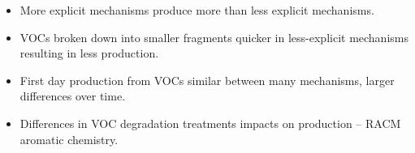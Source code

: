 \begin{BlueBox}
    \vskip-1cm
    \begin{block}{}
        \begin{itemize}
            \item More explicit mechanisms produce more  than less explicit mechanisms. \vspace{10mm}
            \item VOCs broken down into smaller fragments quicker in less-explicit mechanisms resulting in less  production. \vspace{10mm} 
            \item First day  production from VOCs similar between many mechanisms, larger differences over time. \vspace{10mm}
            \item Differences in VOC degradation treatments impacts on  production -- RACM aromatic chemistry. \vspace{10mm}
        \end{itemize}        
    \end{block}
\end{BlueBox}
